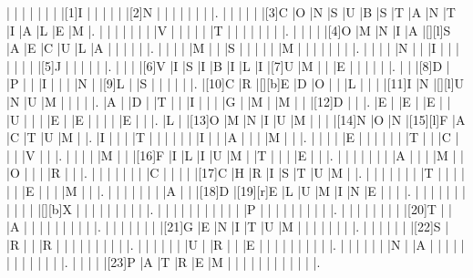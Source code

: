 \documentclass{article}
\begin{document}
\begin{Puzzle}{21}{27}
|{} |{} |{} |{} |{} |{} |{} |[1]I |{} |{} |{} |{} |{} |[2]N |{} |{} |{} |{} |{} |{} |{} |.
|{} |{} |{} |{} |{} |[3]C |O |N |S |U |B |S |T |A |N |T |I |A |L |E |M |.
|{} |{} |{} |{} |{} |{} |{} |V |{} |{} |{} |{} |{} |T |{} |{} |{} |{} |{} |{} |{} |.
|{} |{} |{} |{} |[4]O |M |N |I |A |[][l]S |A |E |C |U |L |A |{} |{} |{} |{} |{} |.
|{} |{} |{} |{} |M |{} |{} |S |{} |{} |{} |{} |{} |M |{} |{} |{} |{} |{} |{} |{} |.
|{} |{} |{} |{} |N |{} |{} |I |{} |{} |{} |{} |{} |{} |{} |[5]J |{} |{} |{} |{} |{} |.
|{} |{} |{} |[6]V |I |S |I |B |I |L |I |[7]U |M |{} |{} |E |{} |{} |{} |{} |{} |.
|{} |{} |[8]D |{} |P |{} |{} |I |{} |{} |{} |N |{} |[9]L |{} |S |{} |{} |{} |{} |{} |.
|[10]C |R |[][b]E |D |O |{} |{} |L |{} |{} |{} |[11]I |N |[][l]U |N |U |M |{} |{} |{} |{} |.
|A |{} |D |{} |T |{} |{} |I |{} |{} |{} |G |{} |M |{} |M |{} |{} |[12]D |{} |{} |.
|E |{} |E |{} |E |{} |{} |U |{} |{} |{} |E |{} |E |{} |{} |{} |{} |E |{} |{} |.
|L |{} |[13]O |M |N |I |U |M |{} |{} |{} |[14]N |O |N |[15][l]F |A |C |T |U |M |{} |.
|I |{} |{} |{} |T |{} |{} |{} |{} |{} |{} |I |{} |{} |A |{} |{} |{} |M |{} |{} |.
|{} |{} |{} |{} |E |{} |{} |{} |{} |{} |{} |T |{} |{} |C |{} |{} |{} |V |{} |{} |.
|{} |{} |{} |{} |M |{} |{} |[16]F |I |L |I |U |M |{} |T |{} |{} |{} |E |{} |{} |.
|{} |{} |{} |{} |{} |{} |{} |A |{} |{} |{} |M |{} |{} |O |{} |{} |{} |R |{} |{} |.
|{} |{} |{} |{} |{} |{} |{} |C |{} |{} |{} |{} |[17]C |H |R |I |S |T |U |M |{} |.
|{} |{} |{} |{} |{} |{} |{} |T |{} |{} |{} |{} |{} |{} |E |{} |{} |{} |M |{} |{} |.
|{} |{} |{} |{} |{} |{} |{} |A |{} |{} |[18]D |[19][r]E |L |U |M |I |N |E |{} |{} |{} |.
|{} |{} |{} |{} |{} |{} |{} |{} |{} |{} |{} |[][b]X |{} |{} |{} |{} |{} |{} |{} |{} |{} |.
|{} |{} |{} |{} |{} |{} |{} |{} |{} |{} |{} |P |{} |{} |{} |{} |{} |{} |{} |{} |{} |.
|{} |{} |{} |{} |{} |{} |{} |{} |[20]T |{} |{} |A |{} |{} |{} |{} |{} |{} |{} |{} |{} |.
|{} |{} |{} |{} |{} |{} |{} |[21]G |E |N |I |T |U |M |{} |{} |{} |{} |{} |{} |{} |.
|{} |{} |{} |{} |{} |{} |[22]S |{} |R |{} |{} |R |{} |{} |{} |{} |{} |{} |{} |{} |{} |.
|{} |{} |{} |{} |{} |{} |U |{} |R |{} |{} |E |{} |{} |{} |{} |{} |{} |{} |{} |{} |.
|{} |{} |{} |{} |{} |{} |N |{} |A |{} |{} |{} |{} |{} |{} |{} |{} |{} |{} |{} |{} |.
|{} |{} |{} |{} |[23]P |A |T |R |E |M |{} |{} |{} |{} |{} |{} |{} |{} |{} |{} |{} |.
\end{Puzzle}
\end{document}
